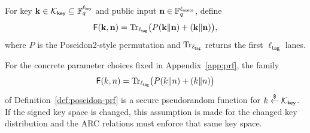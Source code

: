 \begin{definition}\label{def:poseidon-prf}
For key \(\mathbf{k}\in\mathcal K_{\mathsf{key}}\subseteq\mathbb{F}_q^{\ell_{\mathsf{key}}}\) and public input
\(\mathbf{n}\in\mathbb{F}_q^{\ell_{\mathsf{nonce}}}\), define
\[
  \mathsf{F}(\mathbf{k},\mathbf{n})=\mathrm{Tr}_{\ell_{\mathsf{tag}}}\bigl(P(\mathbf{k}\Vert\mathbf{n})+(\mathbf{k}\Vert\mathbf{n})\bigr),
\]
where \(P\) is the Poseidon2-style permutation and \(\mathrm{Tr}_{\ell_{\mathsf{tag}}}\) returns the first
\(\ell_{\mathsf{tag}}\) lanes.
\end{definition}

\begin{assumption}\label{ass:poseidon-prf}
For the concrete parameter choices fixed in Appendix~\ref{app:prf}, the family
\[
  \mathsf{F}(k,n)=\mathrm{Tr}_{\ell_{\mathsf{tag}}}\bigl(P(k\Vert n)+(k\Vert n)\bigr)
\]
of Definition~\ref{def:poseidon-prf} is a secure pseudorandom function for
\(k\overset{\$}{\leftarrow}\mathcal K_{\mathsf{key}}\).  If the signed key space is changed, this assumption is made for the
changed key distribution and the ARC relations must enforce that same key space.
\end{assumption}
